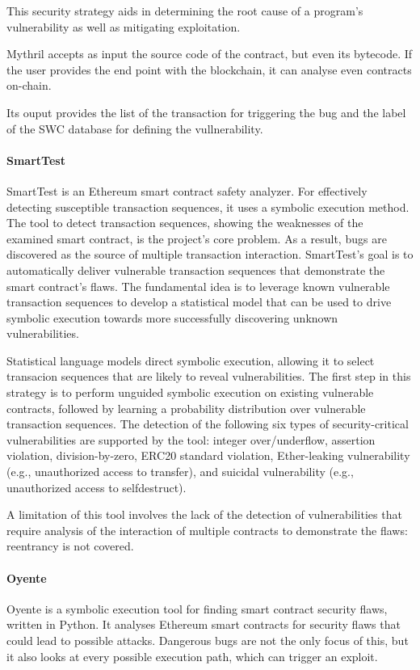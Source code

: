 \documentclass[a4paper,sigconf, language=french,
language=german, language=spanish, language=english]{acmart}
\begin{document}
This security strategy aids in determining the root cause of a program's vulnerability as well as mitigating exploitation.

Mythril accepts as input the source code of the contract, but even its bytecode. If the user provides the end point with the blockchain, it can analyse even contracts on-chain.

Its ouput provides the list of the transaction for triggering the bug and the label of the SWC database for defining the vullnerability.

\paragraph{SmartTest}
SmartTest is an Ethereum smart contract safety analyzer.
For effectively detecting susceptible transaction sequences, it uses a symbolic execution method.
The tool to detect transaction sequences, showing the weaknesses of the examined smart contract, is the project's core problem.
As a result, bugs are discovered as the source of multiple transaction interaction.
SmartTest's goal is to automatically deliver vulnerable transaction sequences that demonstrate the smart contract's flaws. 
The fundamental idea is to leverage known vulnerable transaction sequences to develop a statistical model that can be used to drive symbolic execution 
towards more successfully discovering unknown vulnerabilities.

Statistical language models direct symbolic execution, allowing it to select transacion sequences that are likely to reveal vulnerabilities.
The first step in this strategy is to perform unguided symbolic execution on existing vulnerable contracts, followed by learning a probability 
distribution over vulnerable transaction sequences. The detection of the following six types of security-critical vulnerabilities are supported
by the tool: integer over/underflow, assertion violation, division-by-zero, ERC20 standard
violation, Ether-leaking vulnerability (e.g., unauthorized access to transfer), and suicidal
vulnerability (e.g., unauthorized access to selfdestruct). 

A limitation of this tool involves the lack of the detection of vulnerabilities that require analysis of the interaction of
multiple contracts to demonstrate the flaws: reentrancy is not covered.
\paragraph{Oyente}
Oyente is a symbolic execution tool for finding smart contract security flaws, written in Python.
It analyses Ethereum smart contracts for security flaws that could lead to possible attacks.
Dangerous bugs are not the only focus of this, but it also looks at every possible execution path, which can trigger an exploit.
\end{document}
